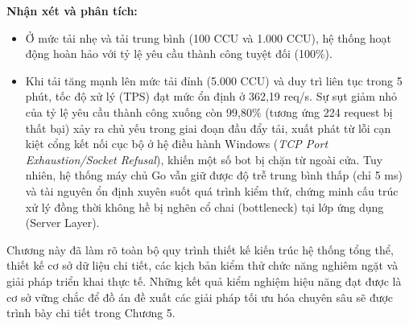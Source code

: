 \documentclass[../Project.tex]{subfiles}
\begin{document}
\begin{table}[H]
\centering
\caption{So sánh thông số hiệu năng hệ thống dưới các mức tải CCU khác nhau (Thời gian test: 5 phút)}
\label{tab:load_test_comparison}
\end{table}

\textbf{Nhận xét và phân tích:}
\begin{itemize}
    \item Ở mức tải nhẹ và tải trung bình (100 CCU và 1.000 CCU), hệ thống hoạt động hoàn hảo với tỷ lệ yêu cầu thành công tuyệt đối (100\%).
    \item Khi tải tăng mạnh lên mức tải đỉnh (5.000 CCU) và duy trì liên tục trong 5 phút, tốc độ xử lý (TPS) đạt mức ổn định ở 362,19 req/s. Sự sụt giảm nhỏ của tỷ lệ yêu cầu thành công xuống còn 99,80\% (tương ứng 224 request bị thất bại) xảy ra chủ yếu trong giai đoạn đầu đẩy tải, xuất phát từ lỗi cạn kiệt cổng kết nối cục bộ ở hệ điều hành Windows (\textit{TCP Port Exhaustion/Socket Refusal}), khiến một số bot bị chặn từ ngoài cửa. Tuy nhiên, hệ thống máy chủ Go vẫn giữ được độ trễ trung bình thấp (chỉ 5 ms) và tài nguyên ổn định xuyên suốt quá trình kiểm thử, chứng minh cấu trúc xử lý đồng thời không hề bị nghẽn cổ chai (bottleneck) tại lớp ứng dụng (Server Layer).
\end{itemize}

\vspace{0.5cm}
Chương này đã làm rõ toàn bộ quy trình thiết kế kiến trúc hệ thống tổng thể, thiết kế cơ sở dữ liệu chi tiết, các kịch bản kiểm thử chức năng nghiêm ngặt và giải pháp triển khai thực tế. Những kết quả kiểm nghiệm hiệu năng đạt được là cơ sở vững chắc để đồ án đề xuất các giải pháp tối ưu hóa chuyên sâu sẽ được trình bày chi tiết trong Chương 5.
\end{document}
